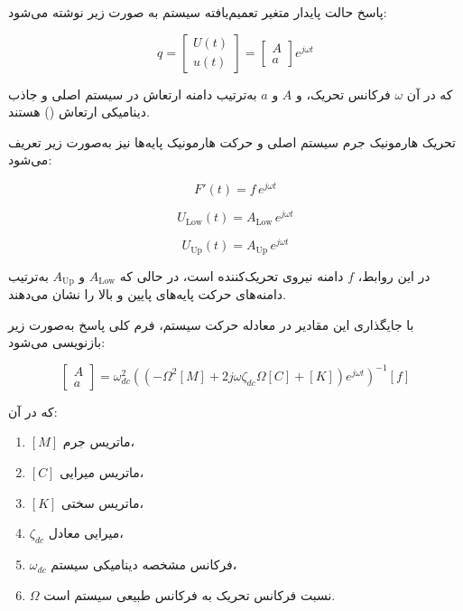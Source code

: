 پاسخ حالت پایدار متغیر تعمیم‌یافته سیستم به صورت زیر نوشته می‌شود:

\begin{equation}
q = 
\begin{bmatrix}
U(t) \\
u(t)
\end{bmatrix}
=
\begin{bmatrix}
A \\
a
\end{bmatrix}
e^{j\omega t}
\end{equation}

که در آن $\omega$ فرکانس تحریک، و $A$ و $a$ به‌ترتیب دامنه ارتعاش در سیستم اصلی و جاذب دینامیکی ارتعاش () هستند.

تحریک هارمونیک جرم سیستم اصلی و حرکت هارمونیک پایه‌ها نیز به‌صورت زیر تعریف می‌شود:

\begin{equation}
F'(t) = f\, e^{j\omega t}
\end{equation}

\begin{equation}
U_{\mathrm{Low}}(t) = A_{\mathrm{Low}}\, e^{j\omega t}
\end{equation}

\begin{equation}
U_{\mathrm{Up}}(t) = A_{\mathrm{Up}}\, e^{j\omega t}
\end{equation}

در این روابط، $f$ دامنه نیروی تحریک‌کننده است، در حالی که $A_{\mathrm{Low}}$ و $A_{\mathrm{Up}}$ به‌ترتیب دامنه‌های حرکت پایه‌های پایین و بالا را نشان می‌دهند.

با جایگذاری این مقادیر در معادله حرکت سیستم، فرم کلی پاسخ به‌صورت زیر بازنویسی می‌شود:

\begin{equation}
\begin{bmatrix}
A \\
a
\end{bmatrix}
=
\omega_{dc}^2 \left(
\left(
-\Omega^2 [M]
+ 2j\omega \zeta_{dc} \Omega [C]
+ [K]
\right) e^{j\omega t}
\right)^{-1}
\left[f\right]
\end{equation}

که در آن:
\begin{enumerate}
  \item $[M]$ ماتریس جرم،
  \item $[C]$ ماتریس میرایی،
  \item $[K]$ ماتریس سختی،
  \item $\zeta_{dc}$ میرایی معادل،
  \item $\omega_{dc}$ فرکانس مشخصه دینامیکی سیستم،
  \item $\Omega$ نسبت فرکانس تحریک به فرکانس طبیعی سیستم است.
\end{enumerate}

